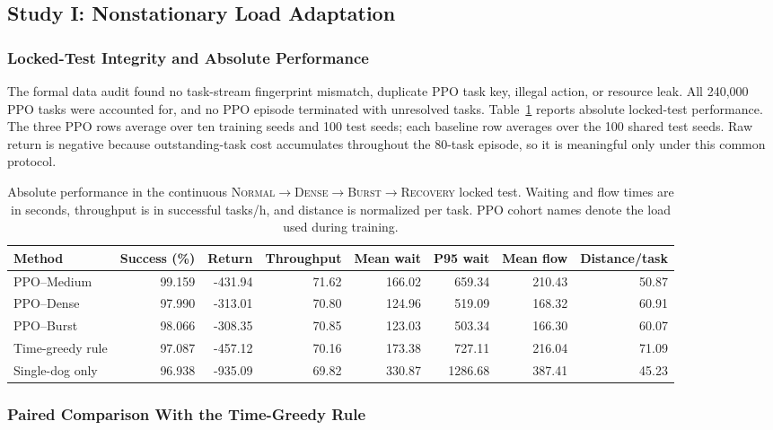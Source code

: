 \documentclass[journal]{IEEEtran}
\begin{document}
\subsection{Study I: Nonstationary Load Adaptation}

\subsubsection{Locked-Test Integrity and Absolute Performance}

The formal data audit found no task-stream fingerprint mismatch, duplicate PPO task key, illegal action, or resource leak. All 240,000 PPO tasks were accounted for, and no PPO episode terminated with unresolved tasks. Table~\ref{tab:stage19_absolute} reports absolute locked-test performance. The three PPO rows average over ten training seeds and 100 test seeds; each baseline row averages over the 100 shared test seeds. Raw return is negative because outstanding-task cost accumulates throughout the 80-task episode, so it is meaningful only under this common protocol.

\begin{table}[!t]
\centering
\caption{Absolute performance in the continuous \textsc{Normal}$\rightarrow$\textsc{Dense}$\rightarrow$\textsc{Burst}$\rightarrow$\textsc{Recovery} locked test. Waiting and flow times are in seconds, throughput is in successful tasks/h, and distance is normalized per task. PPO cohort names denote the load used during training.}
\label{tab:stage19_absolute}
\footnotesize
\setlength{\tabcolsep}{3.4pt}
\begin{tabular}{lrrrrrrr}
\toprule
Method & Success (\%) & Return & Throughput & Mean wait & P95 wait & Mean flow & Distance/task \\
\midrule
PPO--Medium & 99.159 & -431.94 & 71.62 & 166.02 & 659.34 & 210.43 & 50.87 \\
PPO--Dense  & 97.990 & -313.01 & 70.80 & 124.96 & 519.09 & 168.32 & 60.91 \\
PPO--Burst  & 98.066 & -308.35 & 70.85 & 123.03 & 503.34 & 166.30 & 60.07 \\
Time-greedy rule & 97.087 & -457.12 & 70.16 & 173.38 & 727.11 & 216.04 & 71.09 \\
Single-dog only  & 96.938 & -935.09 & 69.82 & 330.87 & 1286.68 & 387.41 & 45.23 \\
\bottomrule
\end{tabular}
\end{table}

\subsubsection{Paired Comparison With the Time-Greedy Rule}
\end{document}
